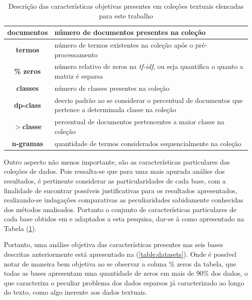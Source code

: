 \begin{table}[!htp]
  \centering
  \begin{tabular}{ |c|p{11cm}|}
    \hline
    {\bf documentos} & número de documentos presentes na coleção \\
    \hline
    {\bf termos} & número de termos existentes na coleção após o pré-processamento \\
    \hline
    {\bf \% zeros} & número relativo de zeros na {\it tf-idf\/}, ou seja quantifica o quanto a
matriz é esparsa \\
    \hline
    {\bf classes} & número de classes presentes na coleção \\
    \hline
    {\bf dp-class} & desvio padrão ao se considerar o percentual de documentos que
pertence a determinada classe na coleção \\
    \hline
    {\bf $>$classe} & percentual de documentos pertencentes a maior classe na coleção \\
    \hline
    {\bf n-gramas} & quantidade de termos considerados sequencialmente na coleção \\
    \hline
  \end{tabular}
  \caption{Descrição das características objetivas presentes em coleções textuais elencadas para
este trabalho}
  \label{table:datainfo}
\end{table}

Outro aspecto não menos importante, são as características particulares das coleções de dados. Pois
ressalta-se que para uma mais apurada análise dos resultados, é pertinente considerar as
particularidades de cada base, com a finalidade de encontrar possíveis justificativas para os
resultados apresentados, realizando-se indagações comparativas as peculiaridades sabidamente
conhecidas dos métodos analisados. Portanto o conjunto de características particulares de cada base
obtidos em  e adaptados a esta pesquisa, dar-se à como apresentado
na Tabela (\ref{table:datainfo}). 


Portanto, uma análise objetiva das características presentes nas seis bases descritas anteriormente 
está apresentado na (\ref{table:datasets}). Onde é possível notar de maneira bem 
objetiva ao se observar
a coluna \% zeros da tabela, que todas as bases apresentam uma quantidade de zeros em mais de $90\%$
dos dados, o que caracteriza o peculiar problema dos dados esparsos já caracterizado ao longo do
texto, como algo inerente aos dados textuais.


